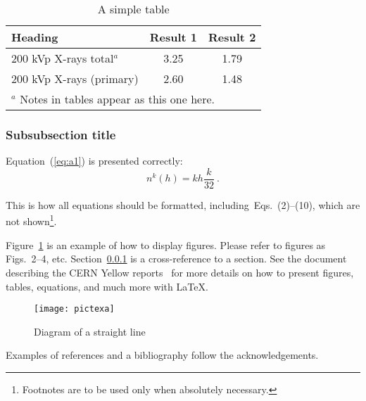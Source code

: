 \begin{table}[h]
\begin{center}
\caption{A simple table}
\label{tab:LET}
\begin{tabular}{p{6cm}cc}
\hline\hline
\textbf{Heading}             & \textbf{Result 1}
                                                & \textbf{Result 2}\\
\hline
200 kVp X-rays total$^{a}$   & 3.25             & 1.79 \\
200 kVp X-rays (primary)     & 2.60             & 1.48 \\
\hline\hline
\multicolumn{3}{l}{$^{a}$ \footnotesize Notes in tables appear as
                      this one here.}
\end{tabular}
\end{center}
\end{table}

\subsubsection{Subsubsection title}
\label{sec:sss}

Equation~(\ref{eq:a1}) is presented correctly:
\begin{equation}
n^k(h)= k h \frac{k}{32}~. \label{eq:a1}  
\end{equation}

This is how all equations should be formatted,
including~Eqs.~(2)--(10), 
which are not shown\footnote{Footnotes are
to be used only when absolutely necessary.}.


Figure~\ref{tab:LET} is an example of how to display figures. Please
refer to figures as Figs.~2--4, etc.
Section~\ref{sec:sss} is a cross-reference to a section. 
See the document describing the CERN Yellow reports~\cite{cernrep} for more
details on how to present figures, tables, equations, and much more
with \LaTeX. 

\begin{figure}[ht]
\begin{center}
\texttt{[image: pictexa]}
\caption{Diagram of a straight line}
\label{fig:line}
\end{center}
\end{figure}

Examples of references and a bibliography follow the acknowledgements.

